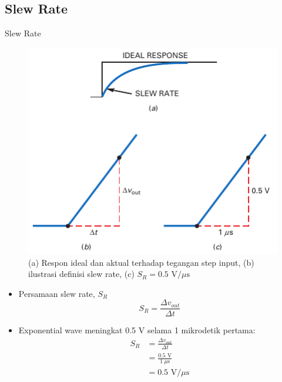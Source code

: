 \subsection{Slew Rate}
\begin{frame}{Slew Rate}
	\begin{multicols}{2}
		\begin{figure}
			\centering
			\includegraphics[width=0.8\linewidth]{gambar/fig-16.08}
			\caption{(a) Respon ideal dan aktual terhadap tegangan step input, (b) ilustrasi definisi slew rate, (c) $ S_R = 0.5 \text{ V/}\mu\text{s} $}
			\label{fig:fig-08a}
		\end{figure}
		\columnbreak
		\begin{itemize}
			\item Persamaan slew rate, $ S_R $
			\begin{equation}\label{pers.1}
				S_R = \frac{\Delta v_{out}}{\Delta t}
			\end{equation}
			\item Exponential wave meningkat 0.5 V selama 1 mikrodetik pertama:
			\begin{align*}
				S_R &= \frac{\Delta v_{out}}{\Delta t} \\
				&= \frac{0.5 \text{ V}}{1~\mu\text{s}} \\
				&= 0.5 \text{ V/}\mu\text{s}
			\end{align*}
		\end{itemize}
	\end{multicols}
\end{frame}

